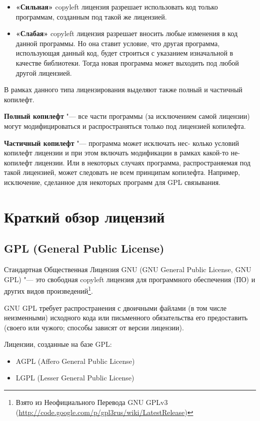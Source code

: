 \documentclass[10pt, a5paper]{article}
\begin{document}
\begin{itemize}
  \item \textbf{«Сильная»} copyleft лицензия  разрешает использовать код только программам, созданным под такой же лицензией.
  \item \textbf{«Слабая»} copyleft лицензия разрешает вносить любые изменения в код данной программы. Но она ставит условие, что другая программа, использующая данный код, будет строиться с указанием изначальной в качестве библиотеки. Тогда новая программа может выходить под любой другой лицензией.
\end{itemize}

В рамках данного типа лицензирования выделяют также полный и частичный копилефт.

\textbf{Полный копилефт} "--- все части программы (за исключением самой лицензии) могут модифицироваться и распространяться только под лицензией копилефта.

\textbf{Частичный копилефт} "--- программа может исключать нес- \linebreak колько условий копилефт лицензии и при этом включать модификации в рамках какой-то не-копилефт лицензии. Или в некоторых случаях программа, распространяемая под такой лицензией, может следовать не всем принципам копилефта. Например, исключение, сделанное для некоторых программ для GPL связывания.

\section*{Краткий обзор лицензий}

\subsection*{GPL (General Public License)}

Стандартная Общественная Лицензия GNU (GNU General Public License, GNU GPL) "--- это свободная copyleft лицензия для программного обеспечения (ПО) и других видов произведений\footnote{Взято из Неофициального Перевода GNU GPLv3 (\url{http://code.google.com/p/gpl3rus/wiki/LatestRelease})}.

GNU GPL требует распространения с двоичными файлами (в том числе неизменными) исходного кода или письменного обязательства его предоставить (своего или чужого; способы зависят от версии лицензии).

Лицензии, созданные на базе GPL:
\begin{itemize}
  \item AGPL (Affero General Public License)
  \item LGPL (Lesser General Public License)
\end{itemize}
\end{document}
